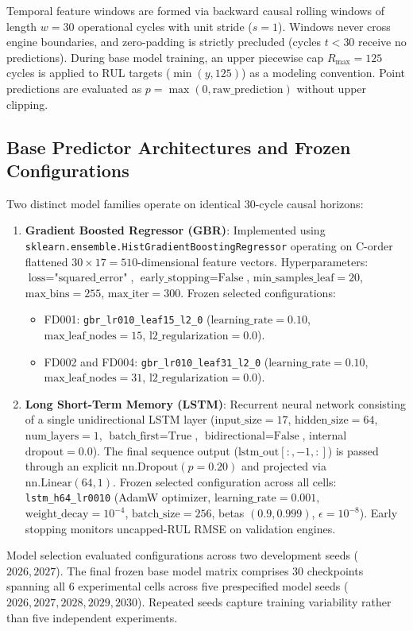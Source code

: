 Temporal feature windows are formed via backward causal rolling windows of length $w = 30$ operational cycles with unit stride ($s = 1$). Windows never cross engine boundaries, and zero-padding is strictly precluded (cycles $t < 30$ receive no predictions). During base model training, an upper piecewise cap $R_{\text{max}} = 125$ cycles is applied to RUL targets ($\min(y, 125)$) as a modeling convention. Point predictions are evaluated as $p = \max(0, \text{raw\_prediction})$ without upper clipping.

\subsection*{Base Predictor Architectures and Frozen Configurations}
Two distinct model families operate on identical 30-cycle causal horizons:
\begin{enumerate}
    \item \textbf{Gradient Boosted Regressor (GBR)}: Implemented using \texttt{sklearn.ensemble.HistGradientBoostingRegressor} operating on C-order flattened $30 \times 17 = 510$-dimensional feature vectors. Hyperparameters: $\text{loss}=\text{"squared\_error"}$, $\text{early\_stopping}=\text{False}$, $\text{min\_samples\_leaf}=20$, $\text{max\_bins}=255$, $\text{max\_iter}=300$. Frozen selected configurations:
    \begin{itemize}
        \item FD001: \texttt{gbr\_lr010\_leaf15\_l2\_0} ($\text{learning\_rate}=0.10$, $\text{max\_leaf\_nodes}=15$, $\text{l2\_regularization}=0.0$).
        \item FD002 and FD004: \texttt{gbr\_lr010\_leaf31\_l2\_0} ($\text{learning\_rate}=0.10$, $\text{max\_leaf\_nodes}=31$, $\text{l2\_regularization}=0.0$).
    \end{itemize}
    \item \textbf{Long Short-Term Memory (LSTM)}: Recurrent neural network consisting of a single unidirectional LSTM layer ($\text{input\_size}=17$, $\text{hidden\_size}=64$, $\text{num\_layers}=1$, $\text{batch\_first}=\text{True}$, $\text{bidirectional}=\text{False}$, internal $\text{dropout}=0.0$). The final sequence output ($\text{lstm\_out}[:, -1, :]$) is passed through an explicit $\text{nn.Dropout}(p=0.20)$ and projected via $\text{nn.Linear}(64, 1)$. Frozen selected configuration across all cells: \texttt{lstm\_h64\_lr0010} (AdamW optimizer, $\text{learning\_rate}=0.001$, $\text{weight\_decay}=10^{-4}$, $\text{batch\_size}=256$, betas $(0.9, 0.999)$, $\epsilon=10^{-8}$). Early stopping monitors uncapped-RUL RMSE on validation engines.
\end{enumerate}
Model selection evaluated configurations across two development seeds ($2026, 2027$). The final frozen base model matrix comprises 30 checkpoints spanning all 6 experimental cells across five prespecified model seeds ($2026, 2027, 2028, 2029, 2030$). Repeated seeds capture training variability rather than five independent experiments.
